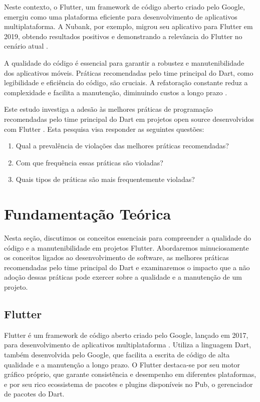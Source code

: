 \documentclass[12pt]{article}
\begin{document}
Neste contexto, o Flutter, um framework de código aberto criado pelo Google, emergiu como uma plataforma eficiente para desenvolvimento de aplicativos multiplataforma. A Nubank, por exemplo, migrou seu aplicativo para Flutter em 2019, obtendo resultados positivos e demonstrando a relevância do Flutter no cenário atual \cite{Nubank2023}.

A qualidade do código é essencial para garantir a robustez e manutenibilidade dos aplicativos móveis. Práticas recomendadas pelo time principal do Dart, como legibilidade e eficiência do código, são cruciais. A refatoração constante reduz a complexidade e facilita a manutenção, diminuindo custos a longo prazo \cite{martin2008clean}.

Este estudo investiga a adesão às melhores práticas de programação recomendadas pelo time principal do Dart em projetos open source desenvolvidos com Flutter \cite{dartBestPractices}. Esta pesquisa visa responder as seguintes questões:
\begin{enumerate}
    \item Qual a prevalência de violações das melhores práticas recomendadas?
    \item Com que frequência essas práticas são violadas?
    \item Quais tipos de práticas são mais frequentemente violadas?
\end{enumerate}

\section{Fundamentação Teórica}
Nesta seção, discutimos os conceitos essenciais para compreender a qualidade do código e a manutenibilidade em projetos Flutter. Abordaremos minuciosamente os conceitos ligados ao desenvolvimento de software, as melhores práticas recomendadas pelo time principal do Dart e examinaremos o impacto que a não adoção dessas práticas pode exercer sobre a qualidade e a manutenção de um projeto.

\subsection{Flutter}
Flutter é um framework de código aberto criado pelo Google, lançado em 2017, para desenvolvimento de aplicativos multiplataforma \cite{google2018flutter}. Utiliza a linguagem Dart, também desenvolvida pelo Google, que facilita a escrita de código de alta qualidade e a manutenção a longo prazo. O Flutter destaca-se por seu motor gráfico próprio, que garante consistência e desempenho em diferentes plataformas, e por seu rico ecossistema de pacotes e plugins disponíveis no Pub, o gerenciador de pacotes do Dart.
\end{document}
